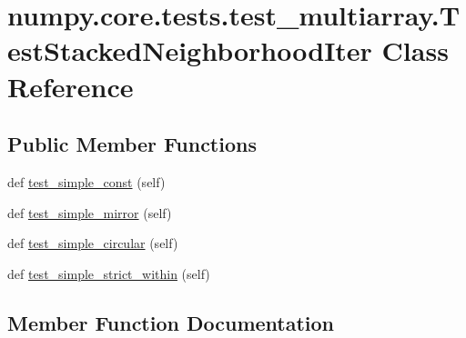 \hypertarget{classnumpy_1_1core_1_1tests_1_1test__multiarray_1_1TestStackedNeighborhoodIter}{}\section{numpy.\+core.\+tests.\+test\+\_\+multiarray.\+Test\+Stacked\+Neighborhood\+Iter Class Reference}
\label{classnumpy_1_1core_1_1tests_1_1test__multiarray_1_1TestStackedNeighborhoodIter}
\subsection*{Public Member Functions}
\begin{DoxyCompactItemize}
\item 
def \hyperlink{classnumpy_1_1core_1_1tests_1_1test__multiarray_1_1TestStackedNeighborhoodIter_a8f0fb4174abb7346e74c919993cbc253}{test\+\_\+simple\+\_\+const} (self)
\item 
def \hyperlink{classnumpy_1_1core_1_1tests_1_1test__multiarray_1_1TestStackedNeighborhoodIter_a012e9dee6e33f116995126cfe1dadb14}{test\+\_\+simple\+\_\+mirror} (self)
\item 
def \hyperlink{classnumpy_1_1core_1_1tests_1_1test__multiarray_1_1TestStackedNeighborhoodIter_a1541656eabdc6141c2c9f48335391528}{test\+\_\+simple\+\_\+circular} (self)
\item 
def \hyperlink{classnumpy_1_1core_1_1tests_1_1test__multiarray_1_1TestStackedNeighborhoodIter_abc8b7db2c78a1fd6e5b999113c2299dc}{test\+\_\+simple\+\_\+strict\+\_\+within} (self)
\end{DoxyCompactItemize}


\subsection{Member Function Documentation}
\mbox{\label{classnumpy_1_1core_1_1tests_1_1test__multiarray_1_1TestStackedNeighborhoodIter_a1541656eabdc6141c2c9f48335391528}} 
